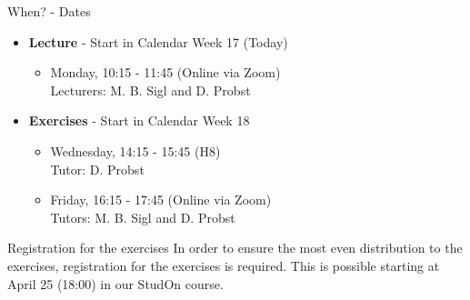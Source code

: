 \begin{frame}{When? - Dates}
	\begin{itemize}
		\item \textbf{Lecture} - Start in Calendar Week 17 (Today)
		      \begin{itemize}
			      \item Monday, 10:15 - 11:45 (Online via Zoom) \\
			            {\color{gray}Lecturers: M. B. Sigl and D. Probst}
		      \end{itemize}
		\item \textbf{Exercises} - Start in Calendar Week 18
		      \begin{itemize}
			      \item Wednesday, 14:15 - 15:45 (H8) \\
			            {\color{gray}Tutor: D. Probst}
			      \item Friday, 16:15 - 17:45 (Online via Zoom) \\
			            {\color{gray}Tutors: M. B. Sigl and D. Probst}
		      \end{itemize}
	\end{itemize}

	\begin{block}{Registration for the exercises}
		In order to ensure the most even distribution to the exercises, registration for the exercises is required. This is possible starting at April 25 (18:00) in our StudOn course.
	\end{block}
\end{frame}


